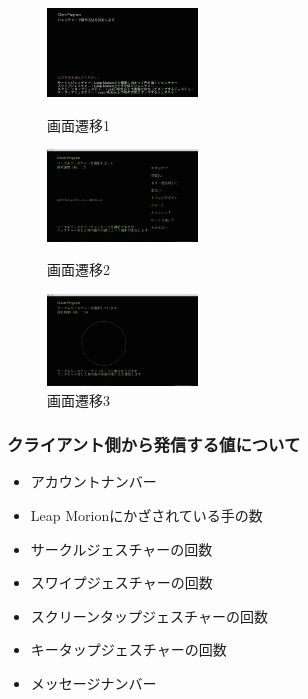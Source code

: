 \documentclass{funthesis}
\begin{document}
\begin{figure}[H]
 \begin{minipage}{0.3\hsize}
  \begin{center}
  \includegraphics[width=40mm]{./img/clseni1.png}
  \end{center}
  \caption{画面遷移1}
  \label{senni1}
 \end{minipage}
 \begin{minipage}{0.3\hsize}
  \begin{center}
  \includegraphics[width=40mm]{./img/clseni2.png}
  \end{center}
  \caption{画面遷移2}
  \label{senni2}
  \end{minipage}
   \begin{minipage}{0.3\hsize}
  \begin{center}
  \includegraphics[width=40mm]{./img/clseni3.png}
  \end{center}
  \caption{画面遷移3}
  \label{senni3}
  \end{minipage}
\end{figure}


\subsubsection{クライアント側から発信する値について}

\begin{itemize}
 \item アカウントナンバー
 \item Leap Morionにかざされている手の数
 \item サークルジェスチャーの回数
 \item スワイプジェスチャーの回数
  \item スクリーンタップジェスチャーの回数
 \item キータップジェスチャーの回数
 \item  メッセージナンバー
\end{itemize}
\end{document}
